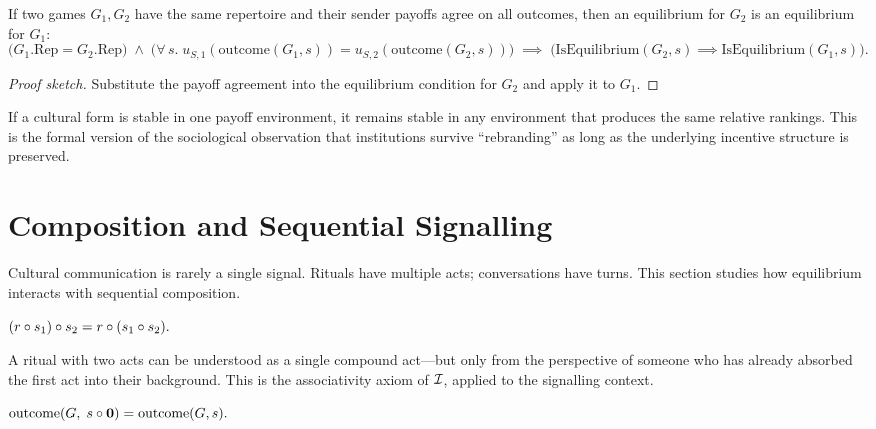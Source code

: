\begin{theorem}
\label{thm:equilibrium-payoff-agreement}
If two games $G_1, G_2$ have the same repertoire and their sender payoffs
agree on all outcomes, then an equilibrium for $G_2$ is an equilibrium
for $G_1$:
\[
  \bigl(G_1.\mathrm{Rep} = G_2.\mathrm{Rep}\bigr)
  \;\wedge\;
  \bigl(\forall\,s.\; u_{S,1}(\mathrm{outcome}(G_1,s)) = u_{S,2}(\mathrm{outcome}(G_2,s))\bigr)
  \;\implies\;
  \bigl(\mathrm{IsEquilibrium}(G_2,s) \implies \mathrm{IsEquilibrium}(G_1,s)\bigr).
\]
\end{theorem}

\begin{proof}[Proof sketch]
Substitute the payoff agreement into the equilibrium condition for $G_2$ and
apply it to $G_1$.
\end{proof}

If a cultural form is stable in one payoff environment, it remains stable in
any environment that produces the same relative rankings.  This is the formal
version of the sociological observation that institutions survive ``rebranding''
as long as the underlying incentive structure is preserved.


\section{Composition and Sequential Signalling}
\label{sec:eq-composition}

Cultural communication is rarely a single signal.  Rituals have multiple
acts; conversations have turns.  This section studies how equilibrium
interacts with sequential composition.

\begin{theorem}
\label{thm:sequential-signal}
$(r\circ s_1)\circ s_2 = r\circ(s_1\circ s_2).$
\end{theorem}

A ritual with two acts can be understood as a single compound act---but only
from the perspective of someone who has already absorbed the first act into
their background.  This is the associativity axiom of $\mathcal{I}$, applied to the
signalling context.

\begin{theorem}
\label{thm:equilibrium-void-extension}
$\mathrm{outcome}(G,\; s\circ\mathbf{0}) = \mathrm{outcome}(G,s).$
\end{theorem}

